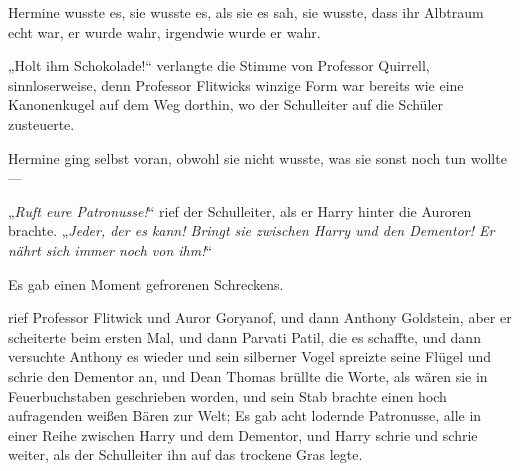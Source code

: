 Hermine wusste es, sie wusste es, als sie es sah, sie wusste, dass ihr Albtraum echt war, er wurde wahr, irgendwie wurde er wahr.

„Holt ihm Schokolade!“ verlangte die Stimme von Professor Quirrell, sinnloserweise, denn Professor Flitwicks winzige Form war bereits wie eine Kanonenkugel auf dem Weg dorthin, wo der Schulleiter auf die Schüler zusteuerte.

Hermine ging selbst voran, obwohl sie nicht wusste, was sie sonst noch tun wollte—

„\emph{Ruft eure Patronusse!}“ rief der Schulleiter, als er Harry hinter die Auroren brachte. „\emph{Jeder, der es kann! Bringt sie zwischen Harry und den Dementor! Er nährt sich immer noch von ihm!}“

Es gab einen Moment gefrorenen Schreckens.

 rief Professor Flitwick und Auror Goryanof, und dann Anthony Goldstein, aber er scheiterte beim ersten Mal, und dann Parvati Patil, die es schaffte, und dann versuchte Anthony es wieder und sein silberner Vogel spreizte seine Flügel und schrie den Dementor an, und Dean Thomas brüllte die Worte, als wären sie in Feuerbuchstaben geschrieben worden, und sein Stab brachte einen hoch aufragenden weißen Bären zur Welt; Es gab acht lodernde Patronusse, alle in einer Reihe zwischen Harry und dem Dementor, und Harry schrie und schrie weiter, als der Schulleiter ihn auf das trockene Gras legte.

